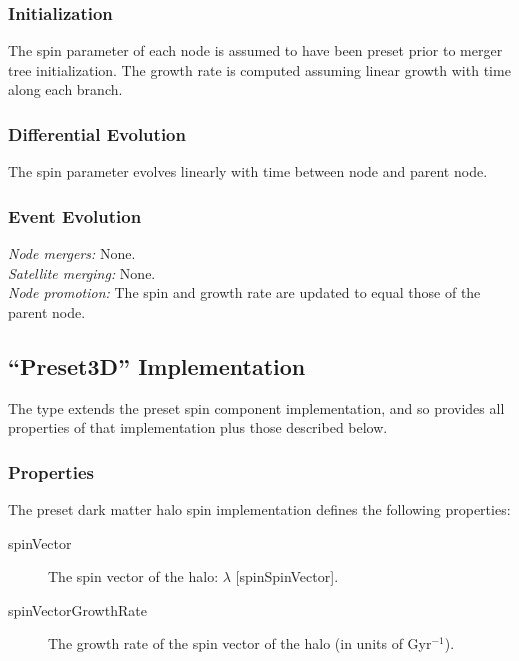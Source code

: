 \subsubsection{Initialization}

The spin parameter of each \gls{node} is assumed to have been preset prior to merger tree initialization. The growth rate is computed assuming linear growth with time along each branch.

\subsubsection{Differential Evolution}

The spin parameter evolves linearly with time between \gls{node} and parent node.

\subsubsection{Event Evolution}

\noindent\emph{Node mergers:} None.\\

\noindent\emph{Satellite merging:} None.\\

\noindent\emph{Node promotion:} The spin and growth rate are updated to equal those of the parent node.\\

\subsection{``Preset3D'' Implementation}

The type extends the {\normalfont \ttfamily preset} spin component implementation, and so provides all properties of that implementation plus those described below.

\subsubsection{Properties}

The preset dark matter halo spin implementation defines the following properties:
\begin{description}
 \item [{\normalfont \ttfamily spinVector}] The spin vector of the halo: $\lambda$ [{\normalfont \ttfamily spinSpinVector}].
 \item [{\normalfont \ttfamily spinVectorGrowthRate}] The growth rate of the spin vector of the halo (in units of Gyr$^{-1}$).
\end{description}


